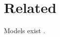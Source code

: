 \documentclass{article}
\begin{document}
\section{Related}
Models exist \cite{smith20,jones19}.


\end{document}
